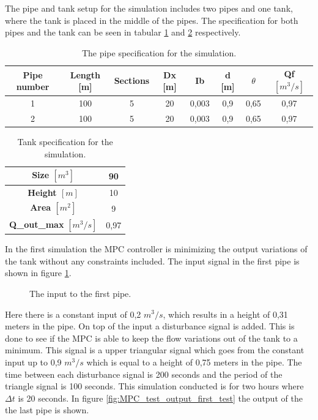The pipe and tank setup for the simulation includes two pipes and one tank, where the tank is placed in the middle of the pipes. The specification for both pipes and the tank can be seen in tabular \ref{tab:pipe_data_for_mpc_test} and \ref{tab:tank_data_for_mpc_test} respectively.

\begin{table}[H]
\centering
\begin{tabular}{|c|c|c|c|c|c|c|c|}
\hline
\textbf{Pipe number} & \textbf{Length} [m] & \textbf{Sections} & \textbf{Dx} [m] & \textbf{Ib} & \textbf{d} [m] & \textbf{$\theta$} & \textbf{Qf $[m^3/s]$} \\ \hline
1&100             & 5                 & 20          & 0,003       & 0,9        & 0,65              & 0,97        \\ \hline
2&100             & 5                 & 20          & 0,003       & 0,9        & 0,65              & 0,97        \\ \hline
\end{tabular}
\caption{The pipe specification for the simulation.}
\label{tab:pipe_data_for_mpc_test}
\end{table}
\begin{table}[H]
\centering
\begin{tabular}{|c|c|}
\hline
\textbf{Size $[m^3]$}        & 90   \\ \hline
\textbf{Height $[m]$}      & 10   \\ \hline
\textbf{Area $[m^2]$}        & 9    \\ \hline
\textbf{Q\_out\_max} $[m^3/s]$& 0,97 \\ \hline
\end{tabular}
\caption{Tank specification for the simulation.}
\label{tab:tank_data_for_mpc_test}
\end{table}

In the first simulation the MPC controller is minimizing the output variations of the tank without any constraints included. The input signal in the first pipe is shown in figure \ref{fig:input_to_pipe_mpc_test}. 
\begin{figure}[H]
 \centering
 
\caption{The input to the first pipe.}
\label{fig:input_to_pipe_mpc_test}
\end{figure}

Here there is a constant input of 0,2 $m^3/s$, which results in a height of 0,31 meters in the pipe. On top of the input a disturbance signal is added. This is done to see if the MPC is able to keep the flow variations out of the tank to a minimum. This signal is a upper triangular signal which goes from the constant input up to 0,9 $m^3/s$ which is equal to a height of 0,75 meters in the pipe. The time between each disturbance signal is 200 seconds and the period of the triangle signal is 100 seconds. This simulation conducted is for two hours where $\Delta t$ is 20 seconds. In figure \ref{fig:MPC_test_output_first_test} the output of the the last pipe is shown.  



